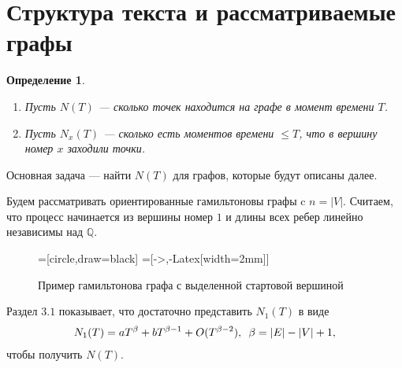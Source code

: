 \documentclass{article}
\newcommand{\squad}{
    \hspace{0.5em}
}
\newtheorem{definition}{Определение}
\begin{document}
\tableofcontents

\pagebreak

\section{Структура текста и рассматриваемые графы}


\begin{definition} $ $
    \begin{enumerate}
        \item Пусть $N(T)$ --- сколько точек находится на графе в момент времени $T$.
        \item Пусть $N_{x}(T)$ --- сколько есть моментов времени $\leq T$, что в вершину номер $x$ заходили точки.
    \end{enumerate}
\end{definition}

Основная задача --- найти $N(T)$ для графов, которые будут описаны далее.

Будем рассматривать ориентированные гамильтоновы графы c $n = |V|$.
Считаем, что процесс начинается из вершины номер $1$ и длины всех ребер линейно независимы над $\mathbb{Q}$. 

\begin{figure}[!htb]
\begin{center}
=[circle,draw=black]
=[->,-{Latex[width=2mm]}]
\caption{Пример гамильтонова графа с выделенной стартовой вершиной}    
\end{center}
\end{figure}

Раздел $3.1$ показывает, что достаточно представить $N_{1}(T)$ в виде
\begin{gather*}
N_{1}(T) = aT^{\beta} + bT^{\beta - 1} + O(T^{\beta - 2}), \squad \beta = |E| - |V| + 1,    
\end{gather*} 
чтобы получить $N(T)$.
\end{document}
